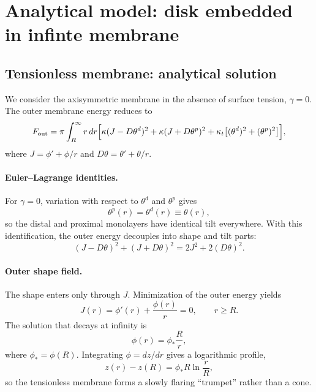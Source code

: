 \documentclass[11pt]{article}
\begin{document}
\section{Analytical model: disk embedded in infinte membrane}
\subsection{Tensionless membrane: analytical solution}

We consider the axisymmetric membrane in the absence of surface tension,
\(\gamma=0\).
The outer membrane energy reduces to
\begin{equation}
F_{\rm out}
=
\pi\int_R^\infty r\,dr
\Big[
\kappa (J-D\theta^d)^2
+\kappa (J+D\theta^p)^2
+\kappa_t \big[(\theta^d)^2+(\theta^p)^2\big]
\Big],
\end{equation}
where
\(
J=\phi'+\phi/r
\)
and
\(
D\theta=\theta'+\theta/r
\).

\paragraph{Euler--Lagrange identities.}
For \(\gamma=0\), variation with respect to \(\theta^d\) and \(\theta^p\) gives
\begin{equation}
\theta^p(r)=\theta^d(r)\equiv\theta(r),
\end{equation}
so the distal and proximal monolayers have identical tilt everywhere.
With this identification, the outer energy decouples into shape and tilt parts:
\begin{equation}
(J-D\theta)^2+(J+D\theta)^2
=
2J^2+2(D\theta)^2.
\end{equation}

\paragraph{Outer shape field.}
The shape enters only through \(J\).
Minimization of the outer energy yields
\begin{equation}
J(r)=\phi'(r)+\frac{\phi(r)}{r}=0,
\qquad r\ge R.
\end{equation}
The solution that decays at infinity is
\begin{equation}
\phi(r)=\phi_*\frac{R}{r},
\end{equation}
where \(\phi_*=\phi(R)\).
Integrating \(\phi=dz/dr\) gives a logarithmic profile,
\begin{equation}
z(r)-z(R)=\phi_*R\ln\!\frac{r}{R},
\end{equation}
so the tensionless membrane forms a slowly flaring ``trumpet'' rather than a cone.
\end{document}
